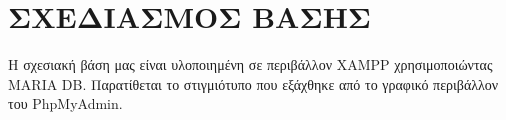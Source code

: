 \chapter{ΣΧΕΔΙΑΣΜΟΣ ΒΑΣΗΣ}
Η σχεσιακή βάση μας είναι υλοποιημένη σε περιβάλλον XAMPP χρησιμοποιώντας MARIA DB.
Παρατίθεται το στιγμιότυπο που εξάχθηκε από το γραφικό περιβάλλον του PhpMyAdmin.

